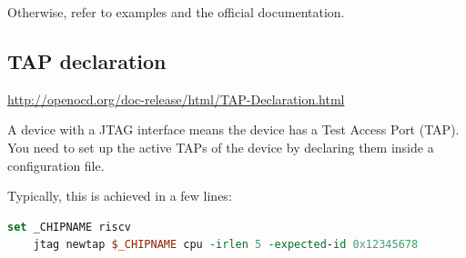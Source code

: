 \documentclass{article}
\begin{document}
    Otherwise, refer to examples and the official documentation.
    
    \subsection{TAP declaration}
    
    \url{http://openocd.org/doc-release/html/TAP-Declaration.html}
    
    A device with a JTAG interface means the device has a Test Access Port (TAP). You need to set up the active TAPs of the device by declaring them inside a configuration file.
    
    Typically, this is achieved in a few lines:
    
    \begin{lstlisting}[language=tcl]
    set _CHIPNAME riscv
    jtag newtap $_CHIPNAME cpu -irlen 5 -expected-id 0x12345678
    \end{lstlisting}
    
    
    
    
	
\end{document}
